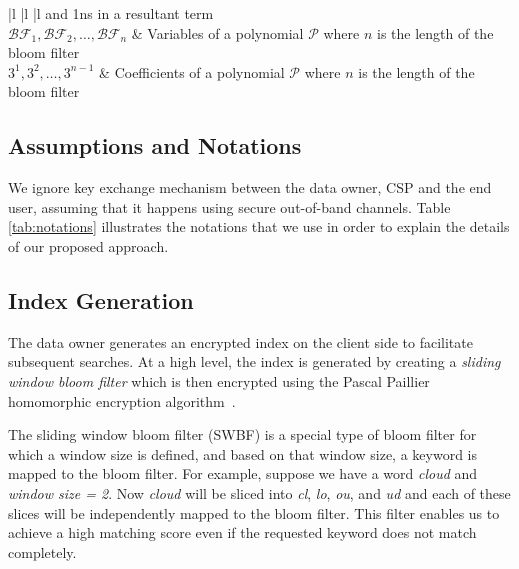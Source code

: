 \begin{table}[t!]
\begin{center}
\begin{tabular}{{ |l |l |l }}
and 1ns in a resultant term \\\hline
\vspace*{\fill}   \centering $\mathcal{BF}_1,\mathcal{BF}_2, \ldots,
\mathcal{BF}_n$ & Variables of a polynomial $\mathcal{P}$ where $n$ is the length of the bloom filter \\\hline
\vspace*{\fill} \centering $3^1, 3^2, \ldots, 3^{n-1}$ &  Coefficients of a
 polynomial $\mathcal{P}$ where $n$ is the length of the bloom filter \\\hline
\end{tabular}
\end{center}
\caption{ Notations used in mathematical and descriptive details  }
\label{tab:notations}
\end{table}


\subsection{Assumptions and Notations}

We ignore key exchange mechanism between the data owner, CSP and the end user, assuming
that it happens using secure out-of-band channels.
Table \ref{tab:notations} illustrates the notations that we use in order to explain
the details of our proposed approach.


\subsection{Index Generation}

The data owner generates an encrypted index on the client side to facilitate
subsequent searches. At a high level, the index is generated by creating a 
\textit{sliding window bloom filter} which is then encrypted using the Pascal Paillier
homomorphic encryption algorithm~\cite{pascal}. 

The sliding window bloom filter (SWBF) is a special type of bloom filter
for which a window size is defined, and based on that
window size, a keyword is mapped to the bloom filter. For example, suppose we have a word
\emph{cloud} and \emph {window size = 2}. Now \emph{cloud} will be sliced into
\emph{cl}, \emph{lo}, \emph{ou}, and \emph{ud} and each of these slices will be 
independently mapped to the bloom filter. This filter enables us to achieve
 a high matching score even if the requested keyword does not match completely.

